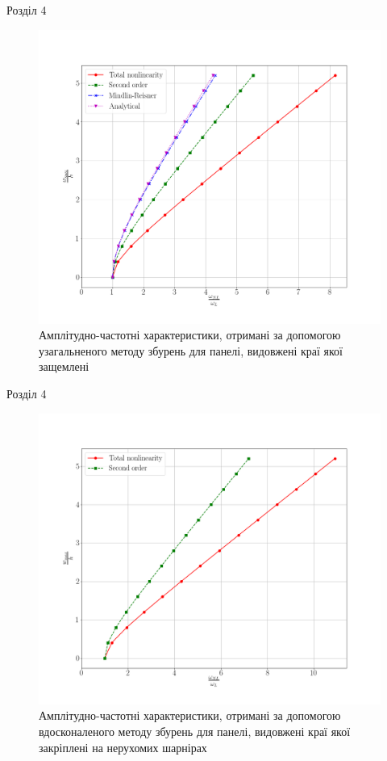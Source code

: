\documentclass[8pt]{beamer}
\numberwithin{figure}{section}
\numberwithin{equation}{section}
\numberwithin{table}{section}
\begin{document}
\begin{frame}{Розділ 4}

\begin{figure}
	\includegraphics[scale=0.2]{pic/AFRC1.png}
		\caption{Амплітудно-частотні характеристики, отримані за допомогою узагальненого методу збурень для панелі, видовжені краї якої защемлені}
		\label{fig:AFR_C}
\end{figure}


\end{frame}

\begin{frame}{Розділ 4}

\begin{figure}
	\includegraphics[scale=0.2]{pic/AFRC2.png}
		\caption{Амплітудно-частотні характеристики, отримані за допомогою вдосконаленого методу збурень для панелі, видовжені краї якої закріплені на нерухомих шарнірах}
		\label{fig:AFR_H}
\end{figure}


\end{frame}
\end{document}
